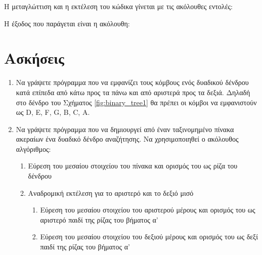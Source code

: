 Η μεταγλώττιση και η εκτέλεση του κώδικα γίνεται με τις ακόλουθες εντολές:



Η έξοδος που παράγεται είναι η ακόλουθη:



\section{Ασκήσεις}

\begin{enumerate}[nolistsep]
\item Να γράψετε πρόγραμμα που να εμφανίζει τους κόμβους ενός δυαδικού δένδρου κατά επίπεδα από κάτω προς τα πάνω και από αριστερά προς τα δεξιά. Δηλαδή στο δένδρο του Σχήματος \ref{fig:binary_tree1} θα πρέπει οι κόμβοι να εμφανιστούν ως D, E, F, G, B, C, A.
\item Να γράψετε πρόγραμμα που να δημιουργεί από έναν ταξινομημένο πίνακα ακεραίων ένα δυαδικό δένδρο αναζήτησης. Να χρησιμοποιηθεί ο ακόλουθος αλγόριθμος:
	\begin{enumerate}[nolistsep]
	\item Εύρεση του μεσαίου στοιχείου του πίνακα και ορισμός του ως ρίζα του δένδρου
	\item Αναδρομική εκτέλεση για το αριστερό και το δεξιό μισό
		\begin{enumerate}[nolistsep]
		\item Εύρεση του μεσαίου στοιχείου του αριστερού μέρους και ορισμός του ως 		αριστερό παιδί της ρίζας του βήματος α'
		\item Εύρεση του μεσαίου στοιχείου του δεξιού μέρους και ορισμός του ως δεξί παιδί της ρίζας του βήματος α'
		\end{enumerate}
	\end{enumerate}
\end{enumerate}

